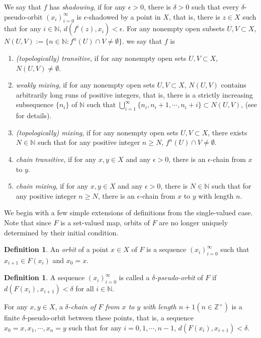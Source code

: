 \documentclass[12pt]{amsart}
\theoremstyle{definition}
\newtheorem{definition}[theorem]{Definition}
\begin{document}
We say that $f$ has \emph{shadowing}, if for any $\epsilon>0$, there is $\delta>0$ such that every $\delta$-pseudo-orbit $(x_i)_{i=0}^\infty$ is $\epsilon$-shadowed by a point in $X$, that is, there is $z\in X$ such that for any $i\in \mathbb{N}$, $d(f^i(z),x_i)<\epsilon$.
For any nonempty open subsets $U,V\subset X$,  $N(U,V):=\{n\in\mathbb{N}:f^n(U)\cap V\neq\emptyset\}$.
we say that $f$ is
\begin{enumerate}
	\item \emph{(topologically) transitive}, if for any nonempty open sets $U,V\subset X$, $N(U,V)\neq\emptyset$.
	
	\item \emph{weakly mixing}, if for any nonempty open sets $U,V\subset X$, $N(U,V)$ contains arbitrarily long runs of positive integers, that is, there is a strictly increasing subsequence $\{n_i\}$ of $\mathbb{N}$ such that $\bigcup_{i=1}^\infty\{n_i,n_i+1,\cdots,n_i+i\}\subset N(U,V)$, (see \cite{Furstenberg1981} for details). 
	
	\item \emph{(topologically) mixing}, if for any nonempty open sets $U,V\subset X$, there exists $N\in\mathbb{N}$ such that for any positive integer $n\geq N$, $f^n(U)\cap V\neq\emptyset$.
	
	\item \emph{chain transitive}, if for any $x,y\in X$ and any $\epsilon>0$, there is an $\epsilon$-chain from $x$ to $y$.
	
	\item \emph{chain mixing}, if for any $x,y\in X$ and any $\epsilon>0$, there is $N\in\mathbb{N}$ such that for any positive integer $n\geq N$, there is an $\epsilon$-chain from $x$ to $y$ with length $n$.
\end{enumerate}

We begin with a few simple extensions of definitions from the single-valued case. Note that since $F$ is a set-valued map, orbits of $F$ are no longer uniquely determined by their initial condition.
\begin{definition}%
	An \emph{orbit} of a point $x\in X$ {of $F$} is a sequence $(x_i)_{i=0}^\infty$ such that $x_{i+1}\in F(x_i)$ and $x_0=x$.
\end{definition}
\begin{definition}
	A sequence $(x_i)_{i=0}^\infty$ is called a \emph{$\delta$-pseudo-orbit} {of $F$} if $d(F(x_i),x_{i+1})<\delta$ for all $i\in \mathbb{N}$.
\end{definition}
For any $x,y\in X$, a \emph{$\delta$-chain of $F$ from $x$ to $y$ with length $n+1(n\in\mathbb{Z}^+)$} is a finite $\delta$-pseudo-orbit between these points, that is, a sequence $x_0=x,x_1,\cdots,x_{n}=y$ such that for any $i=0,1,\cdots,n-1$, $d(F(x_i),x_{i+1})<\delta$. 
\end{document}

